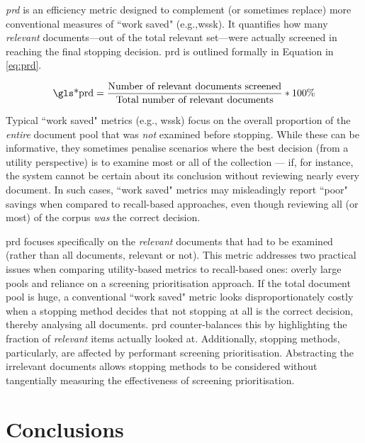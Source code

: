 \documentclass[10pt,oneside]{book}
\begin{document}
\emph{\gls*{prd}} is an efficiency metric designed to complement (or sometimes replace) more conventional measures of ``work saved" (e.g.,\gls*{wssk}). It quantifies how many \emph{relevant} documents—out of the total relevant set—were actually screened in reaching the final stopping decision. \gls*{prd} is outlined formally in Equation in \ref{eq:prd}.

\begin{equation}
\text{\gls*{prd}} = \frac{\text{Number of relevant documents screened}}{\text{Total number of relevant documents}} * 100\%
\label{eq:prd}
\end{equation}

Typical ``work saved" metrics (e.g., \gls*{wssk}) focus on the overall proportion of the \emph{entire} document pool that was \emph{not} examined before stopping. While these can be informative, they sometimes penalise scenarios where the best decision (from a utility perspective) is to examine most or all of the collection — if, for instance, the system cannot be certain about its conclusion without reviewing nearly every document. In such cases, ``work saved" metrics may misleadingly report ``poor" savings when compared to recall-based approaches, even though reviewing all (or most) of the corpus \emph{was} the correct decision.

\gls*{prd} focuses specifically on the \emph{relevant} documents that had to be examined (rather than all documents, relevant or not). This metric addresses two practical issues when comparing utility-based metrics to recall-based ones: overly large pools and reliance on a screening prioritisation approach. If the total document pool is huge, a conventional ``work saved" metric looks disproportionately costly when a stopping method decides that not stopping at all is the correct decision, thereby analysing all documents. \gls*{prd} counter-balances this by highlighting the fraction of \emph{relevant} items actually looked at. Additionally, stopping methods, particularly, are affected by performant screening prioritisation. Abstracting the irrelevant documents allows stopping methods to be considered without tangentially measuring the effectiveness of screening prioritisation.


\section{Conclusions}
\end{document}
